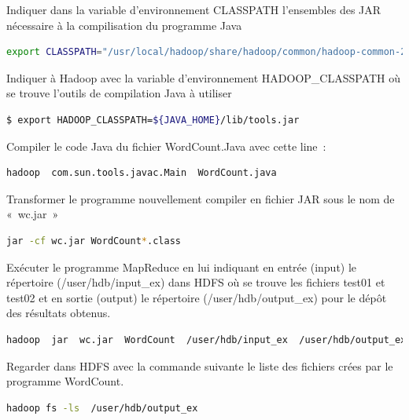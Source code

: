 \documentclass[12pt,english]{book}
\begin{document}
Indiquer dans la variable d’environnement CLASSPATH l’ensembles des JAR nécessaire à la compilisation du programme Java

\begin{lstlisting}[language=bash, frame=single, breaklines=true, postbreak=\mbox{\textcolor{red}{$\hookrightarrow$}\space}]
export CLASSPATH="/usr/local/hadoop/share/hadoop/common/hadoop-common-2.8.0.jar:/usr/local/hadoop/share/hadoop/mapreduce/hadoop-mapreduce-client-common-2.8.0.jar:/usr/local/hadoop/share/hadoop/common/lib/commons-cli-1.2.jar:/usr/local/hadoop/share/hadoop/mapreduce/hadoop-mapreduce-client-core-2.8.0.jar"
\end{lstlisting}

Indiquer à Hadoop avec la variable d’environnement HADOOP\_CLASSPATH où se trouve l’outils de compilation Java à utiliser

\begin{lstlisting}[language=bash, frame=single]
$ export HADOOP_CLASSPATH=${JAVA_HOME}/lib/tools.jar
\end{lstlisting}

Compiler le code Java du fichier WordCount.Java avec cette line :

\begin{lstlisting}[language=bash, frame=single]
hadoop  com.sun.tools.javac.Main  WordCount.java 
\end{lstlisting}

Transformer le programme nouvellement compiler en fichier JAR sous le nom de « wc.jar »

\begin{lstlisting}[language=bash, frame=single]
jar -cf wc.jar WordCount*.class
\end{lstlisting}

Exécuter le programme MapReduce en lui indiquant en entrée (input) le répertoire (/user/hdb/input\_ex) dans HDFS où se trouve les fichiers test01 et test02 et en sortie (output) le répertoire (/user/hdb/output\_ex) pour le dépôt des résultats obtenus. 

\begin{lstlisting}[language=bash, frame=single]
hadoop  jar  wc.jar  WordCount  /user/hdb/input_ex  /user/hdb/output_ex
\end{lstlisting}

Regarder dans HDFS avec la commande suivante le liste des fichiers crées par le programme WordCount.

\begin{lstlisting}[language=bash, frame=single]
hadoop fs -ls  /user/hdb/output_ex
\end{lstlisting}
\end{document}
